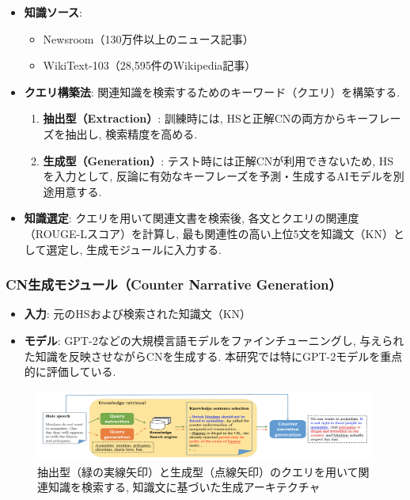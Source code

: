 \documentclass[dvipdfmx]{jsarticle}
\begin{document}
\begin{itemize}
  \item \textbf{知識ソース}:
        \begin{itemize}
          \item Newsroom（130万件以上のニュース記事）
          \item WikiText-103（28,595件のWikipedia記事）
        \end{itemize}

  \item \textbf{クエリ構築法}: 関連知識を検索するためのキーワード（クエリ）を構築する.
        \begin{enumerate}
          \item \textbf{抽出型（Extraction）}: 訓練時には, HSと正解CNの両方からキーフレーズを抽出し, 検索精度を高める.
          \item \textbf{生成型（Generation）}: テスト時には正解CNが利用できないため, HSを入力として, 反論に有効なキーフレーズを予測・生成するAIモデルを別途用意する.
        \end{enumerate}

  \item \textbf{知識選定}:
        クエリを用いて関連文書を検索後, 各文とクエリの関連度（ROUGE-Lスコア）を計算し, 最も関連性の高い上位5文を知識文（KN）として選定し, 生成モジュールに入力する.
\end{itemize}

\vspace{0.5em}

\subsubsection{CN生成モジュール（Counter Narrative Generation）}

\begin{itemize}
  \item \textbf{入力}: 元のHSおよび検索された知識文（KN）
  \item \textbf{モデル}: GPT-2などの大規模言語モデルをファインチューニングし, 与えられた知識を反映させながらCNを生成する.
        本研究では特にGPT-2モデルを重点的に評価している.
\end{itemize}

\begin{figure}[H]
  \centering
  \includegraphics[width=1.0\textwidth]{02.png}
  \caption{抽出型（緑の実線矢印）と生成型（点線矢印）のクエリを用いて関連知識を検索する, 知識文に基づいた生成アーキテクチャ\cite{chung2021}}
  \label{fig:architecture}
\end{figure}
\end{document}
